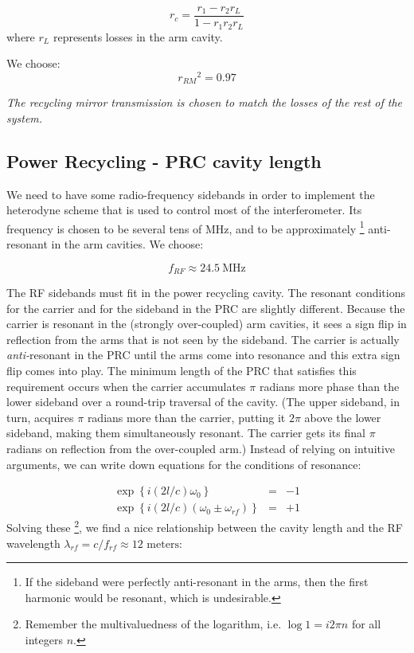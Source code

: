 \begin{equation}
r_{c}=\frac{r_{1}-r_{2}r_L}{1-r_{1}r_{2}r_L}
\end{equation}
where $r_L$ represents losses in the arm cavity.

We choose:
\begin{equation}
r_{RM}{}^{2}=0.97
\end{equation}

\emph{The recycling mirror transmission is chosen to match the losses
of the rest of the system.}

\subsection*{Power Recycling - PRC cavity length}

We need to have some radio-frequency sidebands in order to implement
the heterodyne scheme that is used to control most of the interferometer.
Its frequency is chosen to be several tens of MHz, and to be approximately%
\footnote{If the sideband were perfectly anti-resonant in the arms, then the
first harmonic would be resonant, which is undesirable.%
} anti-resonant in the arm cavities. We choose:

\[
f_{RF}\approx24.5\mathrm{{\ MHz}}
\]

The RF sidebands must fit in the power recycling cavity. The resonant
conditions for the carrier and for the sideband in the PRC are slightly
different. Because the carrier is resonant in the (strongly over-coupled)
arm cavities, it sees a sign flip in reflection from the arms that
is not seen by the sideband. The carrier is actually \emph{anti-}resonant
in the PRC until the arms come into resonance and this extra sign
flip comes into play. The minimum length of the PRC that satisfies
this requirement occurs when the carrier accumulates $\pi$ radians
more phase than the lower sideband over a round-trip traversal of
the cavity. (The upper sideband, in turn, acquires $\pi$ radians
more than the carrier, putting it $2\pi$ above the lower sideband,
making them simultaneously resonant. The carrier gets its final $\pi$
radians on reflection from the over-coupled arm.) Instead of relying
on intuitive arguments, we can write down equations for the conditions
of resonance:

\begin{eqnarray}
\exp \left\{i (2l/c)\omega_{0}  \right\} &=& -1 \\
\exp \left\{i (2l/c)(\omega_{0} \pm \omega_{rf}) \right\} &=& +1
\end{eqnarray}Solving these%
\footnote{Remember the multivaluedness of the logarithm, i.e. $\log1=i2\pi n$
for all integers $n$.%
}, we find a nice relationship between the cavity length and the RF
wavelength $\lambda_{rf}=c/f_{rf}\approx12\text{ meters}$:

